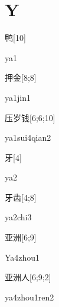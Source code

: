 ﻿%
\section*{Y}

\begin{verbete}[ya1]{鸭}[10]
\begin{pronuncia}{ya1}
\end{pronuncia}
\end{verbete}

\begin{verbete}[ya1jin1]{押金}[8;8]
\begin{pronuncia}{ya1jin1}
\end{pronuncia}
\end{verbete}

\begin{verbete}{压岁钱}[6;6;10]
\begin{pronuncia}{ya1sui4qian2}
\end{pronuncia}
\end{verbete}

\begin{verbete}[ya2]{牙}[4]
\begin{pronuncia}{ya2}
\end{pronuncia}
\end{verbete}

\begin{verbete}[ya2chi3]{牙齿}[4;8]
\begin{pronuncia}{ya2chi3}
\end{pronuncia}
\end{verbete}

\begin{verbete}[Ya4zhou1]{亚洲}[6;9]
\begin{pronuncia}{Ya4zhou1}
\end{pronuncia}
\end{verbete}

\begin{verbete}{亚洲人}[6;9;2]
\begin{pronuncia}{ya4zhou1ren2}
\end{pronuncia}
\end{verbete}

